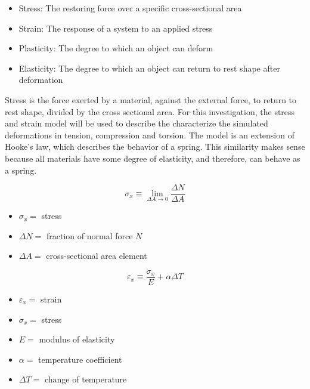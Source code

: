 \documentclass[12pt, letterpaper]{article}
\begin{document}
\begin{itemize}
\item Stress: The restoring force over a specific cross-sectional area
\item Strain: The response of a system to an applied stress
\item Plasticity: The degree to which an object can deform
\item Elasticity: The degree to which an object can return to rest shape after deformation
\end{itemize}

Stress is the force exerted by a material, against the external force, to return to rest shape, divided by the cross sectional area. For this investigation, the stress and strain model will be used to describe the characterize the simulated deformations in tension, compression and torsion. The model is an extension of Hooke's law, which describes the behavior of a spring. This similarity makes sense because all materials have some degree of elasticity, and therefore, can behave as a spring. 

\begin{singlespace}
\begin{equation}
	\label{eq:stress}
	\sigma_x \equiv \lim_{\Delta A \rightarrow 0} \frac{\Delta N}{\Delta A}
\end{equation}
\begin{small}
\begin{itemize}
\item[] $\sigma_x =$ stress
\item[] $\Delta N =$ fraction of normal force $N$
\item[] $\Delta A =$ cross-sectional area element
\end{itemize}
\end{small}
\end{singlespace}


\begin{singlespace}
\begin{equation}
	\label{eq:strain}
	\varepsilon_x \equiv \frac{\sigma_x}{E} + \alpha \Delta T
\end{equation}
\begin{small}
\begin{itemize}
\item[] $\varepsilon_x =$ strain
\item[] $\sigma_x =$ stress
\item[] $E =$ modulus of elasticity
\item[] $\alpha =$ temperature coefficient
\item[] $\Delta T =$ change of temperature
\end{itemize}
\end{small}
\end{singlespace}
\end{document}
